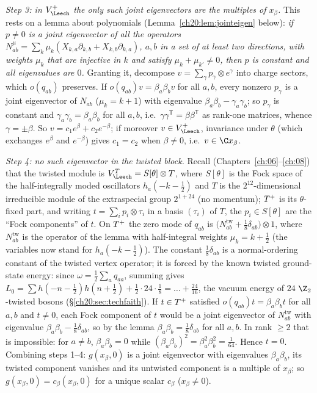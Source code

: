 \emph{Step 3: in $\chtwentyVL$ the only such joint eigenvectors are the multiples of $x_\beta$.}  This rests on a
lemma about polynomials (Lemma~\ref{ch20:lem:jointeigen} below): \emph{if $p\neq0$ is a joint eigenvector of all the
operators $N^\mu_{ab}=\sum_k\mu_k(X_{k,a}\partial_{k,b}+X_{k,b}\partial_{k,a})$, $a,b$ in a set of at least two
directions, with weights $\mu_k$ that are injective in $k$ and satisfy $\mu_k+\mu_{k'}\neq0$, then $p$ is constant and
all eigenvalues are $0$.}  Granting it, decompose $v=\sum_\gamma p_\gamma\otimes e^\gamma$ into charge sectors, which
$o(q_{ab})$ preserves.  If $o(q_{ab})v=\beta_a\beta_bv$ for all $a,b$, every nonzero $p_\gamma$ is a joint eigenvector
of $N_{ab}$ ($\mu_k=k+1$) with eigenvalue $\beta_a\beta_b-\gamma_a\gamma_b$; so $p_\gamma$ is constant and
$\gamma_a\gamma_b=\beta_a\beta_b$ for all $a,b$, i.e.\ $\gamma\gamma^{\mathsf T}=\beta\beta^{\mathsf T}$ as rank-one
matrices, whence $\gamma=\pm\beta$.  So $v=c_1e^\beta+c_2e^{-\beta}$; if moreover $v\in\chtwentyVL$, invariance under
$\theta$ (which exchanges $e^\beta$ and $e^{-\beta}$) gives $c_1=c_2$ when $\beta\ne0$, i.e.\ $v\in\C x_\beta$.

\emph{Step 4: no such eigenvector in the twisted block.}  Recall (Chapters~\ref{ch:06}--\ref{ch:08}) that the twisted module is
$V_\Leech^T=S[\theta]\otimes T$, where $S[\theta]$ is the Fock space of the half-integrally moded oscillators $h_a(-k-\tfrac12)$
and $T$ is the $2^{12}$-dimensional irreducible module of the extraspecial group $2^{1+24}$ (no momentum); $T^{+}$ is its
$\theta$-fixed part, and writing $t=\sum_ip_i\otimes\tau_i$ in a basis $(\tau_i)$ of $T$, the $p_i\in S[\theta]$ are the ``Fock
components'' of $t$.  On $T^{+}$ the zero mode of
$q_{ab}$ is $\bigl(N^{\mathrm{tw}}_{ab}+\tfrac18\delta_{ab}\bigr)\otimes1$, where $N^{\mathrm{tw}}_{ab}$ is the operator
of the lemma with half-integral weights $\mu_k=k+\tfrac12$ (the variables now stand for $h_a(-k-\tfrac12)$).  The
constant $\tfrac18\delta_{ab}$ is a normal-ordering constant of the twisted vertex operator; it is forced by the known
twisted ground-state energy: since $\omega=\tfrac12\sum_aq_{aa}$, summing gives $L_0=\sum h(-n-\tfrac12)h(n+\tfrac12)+\tfrac12\cdot24\cdot\tfrac18
=\dots+\tfrac{24}{16}$, the vacuum energy of $24$ $\Z_2$-twisted bosons (\S\ref{ch20:sec:techfaith}).  If $t\in T^{+}$ satisfied $o(q_{ab})t=\beta_a\beta_bt$ for all $a,b$ and $t\neq0$,
each Fock component of $t$ would be a joint eigenvector of $N^{\mathrm{tw}}_{ab}$ with eigenvalue
$\beta_a\beta_b-\tfrac18\delta_{ab}$, so by the lemma $\beta_a\beta_b=\tfrac18\delta_{ab}$ for all $a,b$.  In rank
$\ge2$ that is impossible: for $a\ne b$, $\beta_a\beta_b=0$ while $(\beta_a\beta_b)^2=\beta_a^2\beta_b^2=\tfrac1{64}$.
Hence $t=0$.  Combining steps 1--4: $g(x_\beta,0)$ is a joint eigenvector with eigenvalues $\beta_a\beta_b$, its
twisted component vanishes and its untwisted component is a multiple of $x_\beta$; so $g(x_\beta,0)=c_\beta(x_\beta,0)$
for a unique scalar $c_\beta$ ($x_\beta\neq0$).


